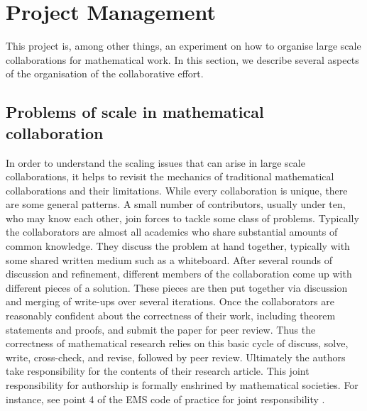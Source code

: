 \section{Project Management}\label{project-sec}

This project is, among other things, an experiment on how to organise large scale collaborations for mathematical work. In this section, we describe several aspects of the organisation of the collaborative effort.

\subsection{Problems of scale in mathematical collaboration}
In order to understand the scaling issues that can arise in large scale collaborations, it helps to revisit the mechanics of traditional mathematical collaborations and their limitations. While every collaboration is unique, there are some general patterns. A small number of contributors, usually under ten, who may know each other, join forces to tackle some class of problems. Typically the collaborators are almost all academics who share substantial amounts of common knowledge. They discuss the problem at hand together, typically with some shared written medium such as a whiteboard. After several rounds of discussion and refinement, different members of the collaboration come up with different pieces of a solution. These pieces are then put together via discussion and merging of write-ups over several iterations. Once the collaborators are reasonably confident about the correctness of their work, including theorem statements and proofs, and submit the paper for peer review. Thus the correctness of mathematical research relies on this basic cycle of discuss, solve, write, cross-check, and revise, followed by peer review. Ultimately the authors take responsibility for the contents of their research article. This joint responsibility for authorship is formally enshrined by mathematical societies. For instance, see point 4 of the EMS code of practice for joint responsibility \cite{EMS_code_of_practice}.

